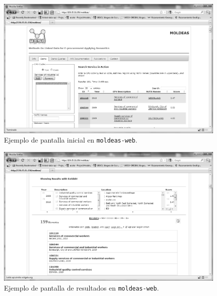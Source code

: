 \begin{figure}[!htb]
\centering
	\includegraphics[width=14cm]{images/phd/moldeas/moldeas-web}
\caption{Ejemplo de pantalla inicial en \texttt{moldeas-web}.}
\label{fig:moldeas-web-screen}
\end{figure}




\begin{figure}[!htb]
\centering
	\includegraphics[width=14cm]{images/phd/moldeas/moldeas-results}
\caption{Ejemplo de pantalla de resultados en \texttt{moldeas-web}.}
\label{fig:moldeas-results-screen}
\end{figure}





